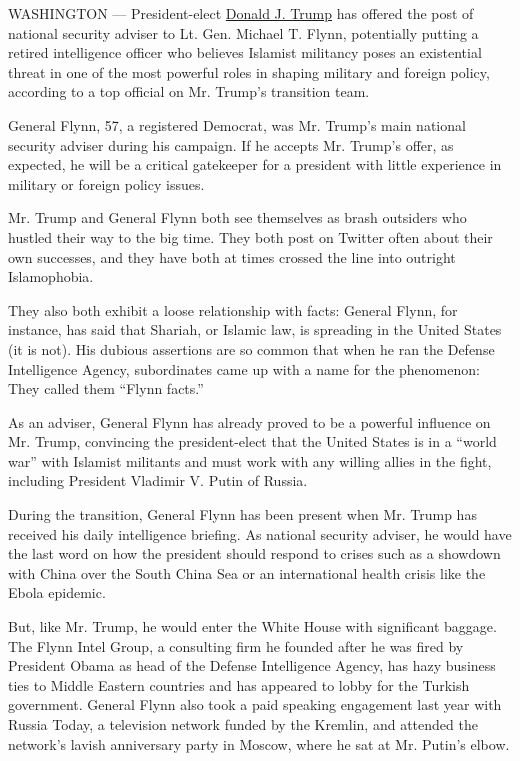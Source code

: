 WASHINGTON --- President-elect
\href{http://www.nytimes.com/2016/11/18/us/politics/donald-trump-transition.html}{Donald
J. Trump} has offered the post of national security adviser to Lt. Gen.
Michael T. Flynn, potentially putting a retired intelligence officer who
believes Islamist militancy poses an existential threat in one of the
most powerful roles in shaping military and foreign policy, according to
a top official on Mr. Trump's transition team.

General Flynn, 57, a registered Democrat, was Mr. Trump's main national
security adviser during his campaign. If he accepts Mr. Trump's offer,
as expected, he will be a critical gatekeeper for a president with
little experience in military or foreign policy issues.

Mr. Trump and General Flynn both see themselves as brash outsiders who
hustled their way to the big time. They both post on Twitter often about
their own successes, and they have both at times crossed the line into
outright Islamophobia.

They also both exhibit a loose relationship with facts: General Flynn,
for instance, has said that Shariah, or Islamic law, is spreading in the
United States (it is not). His dubious assertions are so common that
when he ran the Defense Intelligence Agency, subordinates came up with a
name for the phenomenon: They called them ``Flynn facts.''

As an adviser, General Flynn has already proved to be a powerful
influence on Mr. Trump, convincing the president-elect that the United
States is in a ``world war'' with Islamist militants and must work with
any willing allies in the fight, including President Vladimir V. Putin
of Russia.

During the transition, General Flynn has been present when Mr. Trump has
received his daily intelligence briefing. As national security adviser,
he would have the last word on how the president should respond to
crises such as a showdown with China over the South China Sea or an
international health crisis like the Ebola epidemic.

But, like Mr. Trump, he would enter the White House with significant
baggage. The Flynn Intel Group, a consulting firm he founded after he
was fired by President Obama as head of the Defense Intelligence Agency,
has hazy business ties to Middle Eastern countries and has appeared to
lobby for the Turkish government. General Flynn also took a paid
speaking engagement last year with Russia Today, a television network
funded by the Kremlin, and attended the network's lavish anniversary
party in Moscow, where he sat at Mr. Putin's elbow.

